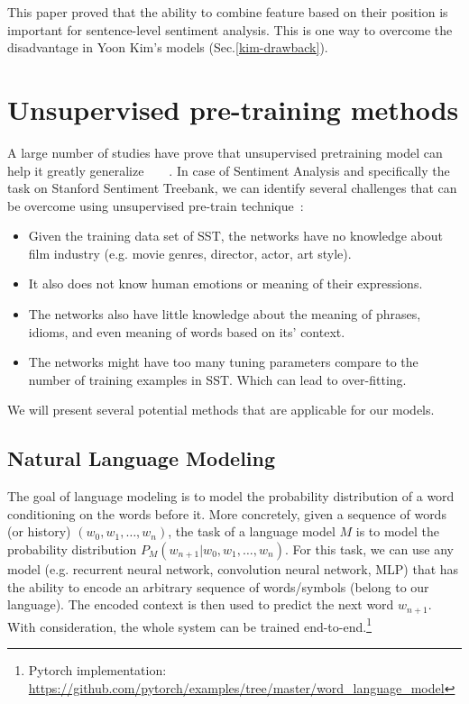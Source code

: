 This paper proved that the ability to combine feature based on their position is important for sentence-level sentiment analysis. 
This is one way to overcome the disadvantage in Yoon Kim's models (Sec.\ref{kim-drawback}).


\section{Unsupervised pre-training methods}\label{sec:unsupervised-pretrain}
A large number of studies have prove that unsupervised pretraining model can help it greatly generalize~\cite{why-unsupervised}~\cite{greedy-layer}~\cite{greedy-layer-bengio}~\cite{pretrain-1}.
In case of Sentiment Analysis and specifically the task on Stanford Sentiment Treebank, we can identify several challenges that can be overcome using unsupervised pre-train technique~\cite{why-unsupervised}:
\begin{itemize}
\item Given the training data set of SST, the networks have no knowledge about film industry (e.g. movie genres, director, actor, art style). 
\item It also does not know human emotions or meaning of their expressions.
\item The networks also have little knowledge about the meaning of phrases, idioms, and even meaning of words based on its' context.
\item The networks might have too many tuning parameters compare to the number of training examples in SST. 
Which can lead to over-fitting.
\end{itemize}
We will present several potential methods that are applicable for our models. 

\subsection{Natural Language Modeling}\label{sec:nlm}
The goal of language modeling is to model the probability distribution of a word conditioning on the words before it.
More concretely, given a sequence of words (or history) \((w_0, w_1,\ldots,w_n)\), the task of a language model \(M\) is to model the probability distribution \(P_M(w_{n+1}|w_0, w_1,\ldots,w_n)\). 
For this task, we can use any model (e.g. recurrent neural network, convolution neural network, MLP) that has the ability to encode an arbitrary sequence of words/symbols (belong to our language).
The encoded context is then used to predict the next word \(w_{n+1}\).
With consideration, the whole system can be trained end-to-end.\footnote{Pytorch implementation: \url{https://github.com/pytorch/examples/tree/master/word\_language\_model}}

